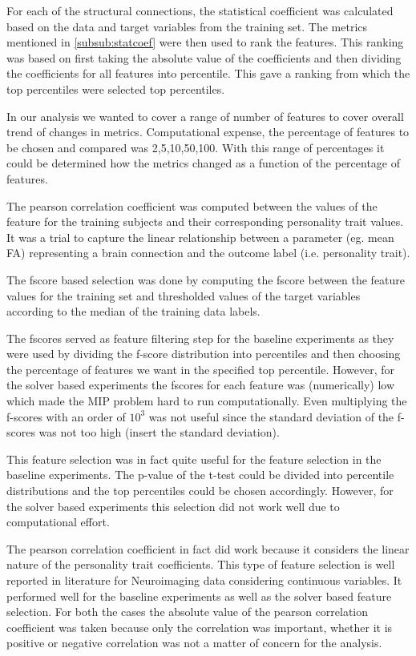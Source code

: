 \documentclass[msthesis.tex]{subfiles}
\begin{document}
For each of the structural connections, the statistical coefficient was calculated based on the data and target variables from the training set. The metrics mentioned in \ref{subsub:statcoef} were then used to rank the features. This ranking was based on first taking the absolute value of the coefficients and then dividing the coefficients for all features into percentile. This gave a ranking from which the top percentiles were selected top percentiles.

In our analysis we wanted to cover a range of number of features to cover overall trend of changes in metrics. Computational expense, the percentage of features to be chosen and compared was 2,5,10,50,100. With this range of percentages it could be determined how the metrics changed as a function of the percentage of features.


\iffalse
The pearson correlation coefficient was computed between the values of the feature for the training subjects and their corresponding personality trait values. It was a trial to capture the linear relationship between a parameter (eg. mean FA) representing a brain connection and the outcome label (i.e. personality trait).

The fscore based selection was done by computing the fscore between the feature values for the training set and thresholded values of the target variables according to the median of the training data labels. 

The fscores served as feature filtering step for the baseline experiments as they were used by dividing the f-score distribution into percentiles and then choosing the percentage of features we want in the specified top percentile. However, for the solver based experiments the fscores for each feature was (numerically) low which made the MIP problem hard to run computationally. Even multiplying the f-scores with an order of $10^3$ was not useful since the standard deviation of the f-scores was not too high (insert the standard deviation). 

This feature selection was in fact quite useful for the feature selection in the baseline experiments. The p-value of the t-test could be divided into percentile distributions and the top percentiles could be chosen accordingly. However, for the solver based experiments this selection did not work well due to computational effort. 

The pearson correlation coefficient in fact did work because it considers the linear nature of the personality trait coefficients. This type of feature selection is well reported in literature for Neuroimaging data considering continuous variables. It performed well for the baseline experiments as well as the solver based feature selection. For both the cases the absolute value of the pearson correlation coefficient was taken because only the correlation was important, whether it is positive or negative correlation was not a matter of concern for the analysis.
\end{document}
